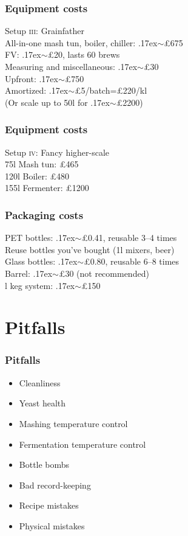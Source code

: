 \documentclass{beamer}
\newcommand{\like}{\raise.17ex\hbox{$\scriptstyle\sim$}}
\begin{document}
\begin{frame}
  \frametitle{Equipment costs}
  Setup \textsc{iii}: Grainfather\\
   All-in-one mash tun, boiler, chiller: \like £675\\
   FV: \like £20, lasts 60 brews\\
   Measuring and miscellaneous: \like £30\\
   Upfront: \like £750\\
   Amortized: \like £5/batch=£220/kl\\\bigskip
   (Or scale up to 50l for \like £2200)
\end{frame}

\begin{frame}
  \frametitle{Equipment costs}
  Setup \textsc{iv}: Fancy higher-scale\\
   75l Mash tun: £465\\
   120l Boiler: £480\\
   155l Fermenter: £1200
\end{frame}

\begin{frame}
  \frametitle{Packaging costs}
   PET bottles: \like £0.41, reusable 3--4 times\\
   Reuse bottles you've bought (1l mixers, beer)\\
   Glass bottles: \like £0.80, reusable 6--8 times\\
   Barrel: \like £30 (not recommended)\\
   l keg system: \like £150
\end{frame}

\section{Pitfalls}
\begin{frame}
  \frametitle{Pitfalls}
  \begin{itemize}
   
    \item Cleanliness\\
    \item Yeast health\\
    \item Mashing temperature control\\
    \item Fermentation temperature control\\
    \item Bottle bombs\\
    \item Bad record-keeping\\
    \item Recipe mistakes\\
    \item Physical mistakes
  \end{itemize}
\end{frame}
\end{document}
